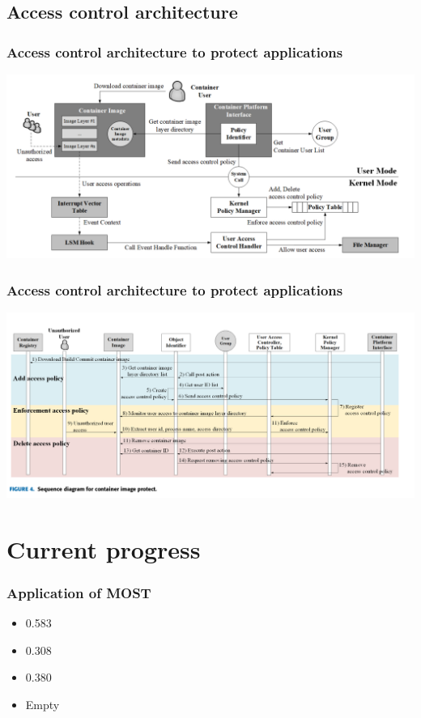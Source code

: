 \documentclass{beamer}
\begin{document}
\subsection{Access control architecture}
\begin{frame}
    \frametitle{Access control architecture to protect applications}
    \includegraphics[width=\textwidth]{architecture.png}\cite{Access_Control_Architecture}
\end{frame}

\begin{frame}
    \frametitle{Access control architecture to protect applications}
    \includegraphics[width=\textwidth]{access_sequence_diagram.png}\cite{Access_Control_Architecture}
\end{frame}


\section{Current progress}
\begin{frame}
    \frametitle{Application of MOST}
    \begin{itemize}
        \item {}  0.583
        \item {}  0.308
        \item {}  0.380
        \item {}  Empty
    \end{itemize}
\end{frame}
\end{document}
